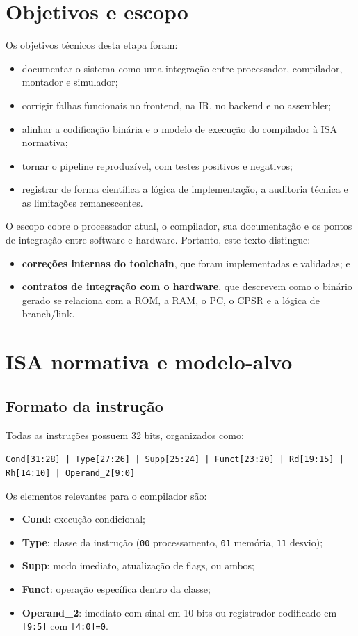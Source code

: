 \documentclass[12pt,a4paper]{article}
\begin{document}
\section{Objetivos e escopo}
Os objetivos técnicos desta etapa foram:
\begin{itemize}[leftmargin=1.5em]
    \item documentar o sistema como uma integração entre processador, compilador, montador e simulador;
    \item corrigir falhas funcionais no frontend, na IR, no backend e no assembler;
    \item alinhar a codificação binária e o modelo de execução do compilador à ISA normativa;
    \item tornar o pipeline reproduzível, com testes positivos e negativos;
    \item registrar de forma científica a lógica de implementação, a auditoria técnica e as limitações remanescentes.
\end{itemize}

O escopo cobre o processador atual, o compilador, sua documentação e os pontos de integração entre software e hardware. Portanto, este texto distingue:
\begin{itemize}[leftmargin=1.5em]
    \item \textbf{correções internas do toolchain}, que foram implementadas e validadas; e
    \item \textbf{contratos de integração com o hardware}, que descrevem como o binário gerado se relaciona com a ROM, a RAM, o PC, o CPSR e a lógica de branch/link.
\end{itemize}

\section{ISA normativa e modelo-alvo}
\subsection{Formato da instrução}
Todas as instruções possuem 32 bits, organizados como:
\begin{center}
\texttt{Cond[31:28] | Type[27:26] | Supp[25:24] | Funct[23:20] | Rd[19:15] | Rh[14:10] | Operand\_2[9:0]}
\end{center}

Os elementos relevantes para o compilador são:
\begin{itemize}[leftmargin=1.5em]
    \item \textbf{Cond}: execução condicional;
    \item \textbf{Type}: classe da instrução (\texttt{00} processamento, \texttt{01} memória, \texttt{11} desvio);
    \item \textbf{Supp}: modo imediato, atualização de flags, ou ambos;
    \item \textbf{Funct}: operação específica dentro da classe;
    \item \textbf{Operand\_2}: imediato com sinal em 10 bits ou registrador codificado em \texttt{[9:5]} com \texttt{[4:0]=0}.
\end{itemize}
\end{document}
